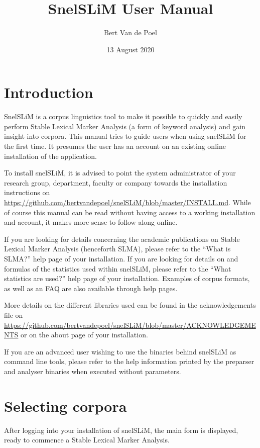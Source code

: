 \documentclass[11pt,a4paper]{article}
\title{SnelSLiM User Manual}
\author{Bert Van de Poel}
\date{13 August 2020}
\begin{document}
\maketitle

\tableofcontents

\newpage

\section{Introduction}

SnelSLiM is a corpus linguistics tool to make it possible to quickly and easily perform Stable Lexical Marker Analysis (a form of keyword analysis) and gain insight into corpora. This manual tries to guide users when using snelSLiM for the first time. It presumes the user has an account on an existing online installation of the application.

To install snelSLiM, it is advised to point the system administrator of your research group, department, faculty or company towards the installation instructions on \url{https://github.com/bertvandepoel/snelSLiM/blob/master/INSTALL.md}. While of course this manual can be read without having access to a working installation and account, it makes more sense to follow along online. 

If you are looking for details concerning the academic publications on Stable Lexical Marker Analysis (henceforth SLMA), please refer to the ``What is SLMA?'' help page of your installation. If you are looking for details on and formulas of the statistics used within snelSLiM, please refer to the ``What statistics are used?'' help page of your installation. Examples of corpus formats, as well as an FAQ are also available through help pages.

More details on the different libraries used can be found in the acknowledgements file on \url{https://github.com/bertvandepoel/snelSLiM/blob/master/ACKNOWLEDGEMENTS} or on the about page of your installation.

If you are an advanced user wishing to use the binaries behind snelSLiM as command line tools, please refer to the help information printed by the preparser and analyser binaries when executed without parameters.

\section{Selecting corpora}

After logging into your installation of snelSLiM, the main form is displayed, ready to commence a Stable Lexical Marker Analysis. 
\end{document}

